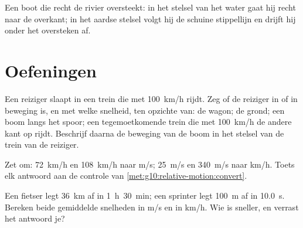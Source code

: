 \begin{omfigure}

{\small Een boot die recht de rivier oversteekt: in het stelsel van het
water gaat hij recht naar de overkant; in het aardse stelsel volgt hij
de schuine stippellijn en drijft hij onder het oversteken af.}
\end{omfigure}

\section{Oefeningen}

\begin{exercise}[$\star$]\label{exo:g10:relative-motion:1}
Een reiziger slaapt in een trein die met \qty{100}{km/h} rijdt. Zeg of de
reiziger in  of in beweging is, en met welke snelheid, ten opzichte
van: de wagon; de grond; een boom langs het spoor; een tegemoetkomende
trein die met \qty{100}{km/h} de andere kant op rijdt. Beschrijf daarna
de beweging van de boom in het stelsel van de trein van de reiziger.
\end{exercise}

\begin{exercise}[$\star$]\label{exo:g10:relative-motion:2}
Zet om: \qty{72}{km/h} en \qty{108}{km/h} naar \unit{m/s};
\qty{25}{m/s} en \qty{340}{m/s} naar \unit{km/h}. Toets elk antwoord aan
de controle van \cref{met:g10:relative-motion:convert}.
\end{exercise}

\begin{exercise}[$\star$]\label{exo:g10:relative-motion:3}
Een fietser legt \qty{36}{km} af in \qty{1}{h}~\qty{30}{min}; een
sprinter legt \qty{100}{m} af in \qty{10.0}{s}. Bereken beide gemiddelde
snelheden in \unit{m/s} en in \unit{km/h}. Wie is sneller, en verrast het
antwoord je?
\end{exercise}

